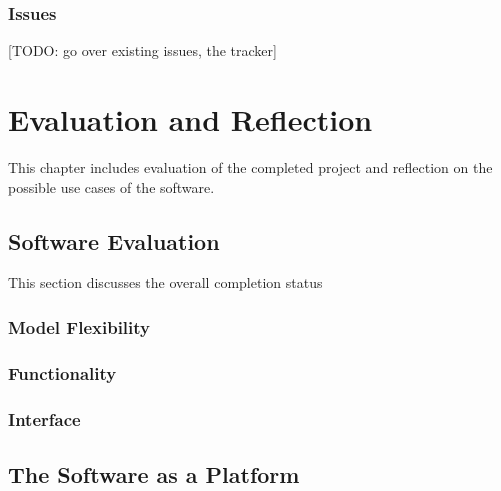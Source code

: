 \documentclass[bsc,frontabs,twoside,singlespacing,parskip,deptreport]{infthesis}     %
\begin{document}
\subsection{Issues}
    [TODO: go over existing issues, the tracker]
    
\chapter{Evaluation and Reflection}

This chapter includes evaluation of the completed project and reflection on the possible use cases of the software. 


\section{Software Evaluation}

	This section discusses the overall completion status 

\subsection{Model Flexibility}

\subsection{Functionality}


\subsection{Interface}



\section{The Software as a Platform}
\end{document}
